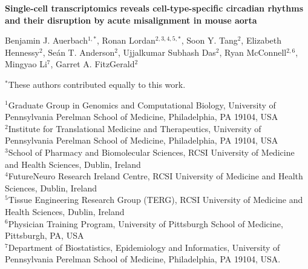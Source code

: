 \documentclass[12pt]{article}
\begin{document}
\begin{titlepage}
\centering
\vspace*{2cm}

{\Large\bfseries Single-cell transcriptomics reveals cell-type-specific circadian rhythms and their
disruption by acute misalignment in mouse aorta}

\vspace{1.5cm}

Benjamin J. Auerbach$^{1,*}$, Ronan Lordan$^{2,3,4,5,*}$, Soon Y. Tang$^{2}$, Elizabeth Hennessy$^{2}$,
Se\'{a}n T. Anderson$^{2}$, Ujjalkumar Subhash Das$^{2}$, Ryan McConnell$^{2,6}$,
Mingyao Li$^{7}$, Garret A. FitzGerald$^{2}$

\vspace{0.3cm}
{\small $^{*}$These authors contributed equally to this work.}

\vspace{1cm}

\begin{flushleft}
$^{1}$Graduate Group in Genomics and Computational Biology, University of Pennsylvania Perelman
School of Medicine, Philadelphia, PA 19104, USA\\[4pt]
$^{2}$Institute for Translational Medicine and Therapeutics, University of Pennsylvania Perelman
School of Medicine, Philadelphia, PA 19104, USA\\[4pt]
$^{3}$School of Pharmacy and Biomolecular Sciences, RCSI University of Medicine and Health Sciences, 
Dublin, Ireland\\[4pt]
$^{4}$FutureNeuro Research Ireland Centre, RCSI University of Medicine and Health Sciences, 
Dublin, Ireland\\[4pt]
$^{5}$Tissue Engineering Research Group (TERG), RCSI University of Medicine and Health Sciences, 
Dublin, Ireland\\[4pt]
$^{6}$Physician Training Program, University of Pittsburgh School of Medicine, Pittsburgh, PA, USA\\[4pt]
$^{7}$Department of Biostatistics, Epidemiology and Informatics, University of Pennsylvania Perelman
School of Medicine, Philadelphia, PA 19104, USA.
\end{flushleft}

\vspace{1cm}


\end{titlepage}
\end{document}
